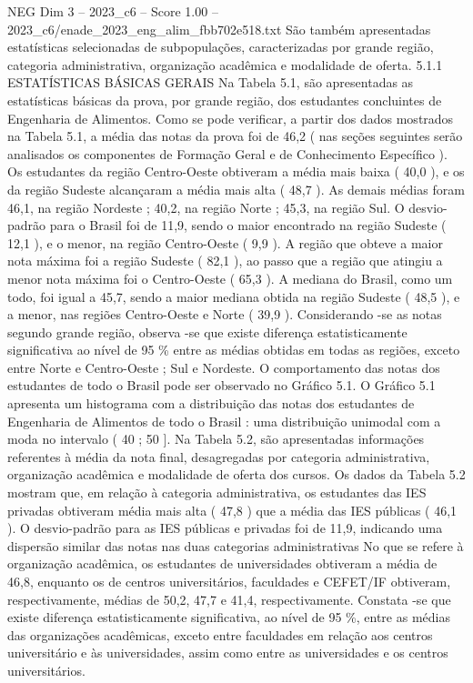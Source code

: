 \begin{textsample}{NEG Dim 3 – 2023\_c6 – Score 1.00 – 2023\_c6/enade\_2023\_eng\_alim\_fbb702e518.txt}
São também apresentadas estatísticas selecionadas de subpopulações, caracterizadas por grande região, categoria administrativa, organização acadêmica e modalidade de oferta. 5.1.1 ESTATÍSTICAS BÁSICAS GERAIS Na Tabela 5.1, são apresentadas as estatísticas básicas da prova, por grande região, dos estudantes concluintes de Engenharia de Alimentos.
Como se pode verificar, a partir dos dados mostrados na Tabela 5.1, a média das notas da prova foi de 46,2 ( nas seções seguintes serão analisados os componentes de Formação Geral e de Conhecimento Específico ).
Os estudantes da região Centro-Oeste obtiveram a média mais baixa ( 40,0 ), e os da região Sudeste alcançaram a média mais alta ( 48,7 ).
As demais médias foram 46,1, na região Nordeste ; 40,2, na região Norte ; 45,3, na região Sul.
O desvio-padrão para o Brasil foi de 11,9, sendo o maior encontrado na região Sudeste ( 12,1 ), e o menor, na região Centro-Oeste ( 9,9 ).
A região que obteve a maior nota máxima foi a região Sudeste ( 82,1 ), ao passo que a região que atingiu a menor nota máxima foi o Centro-Oeste ( 65,3 ).
A mediana do Brasil, como um todo, foi igual a 45,7, sendo a maior mediana obtida na região Sudeste ( 48,5 ), e a menor, nas regiões Centro-Oeste e Norte ( 39,9 ).
Considerando -se as notas segundo grande região, observa -se que existe diferença estatisticamente significativa ao nível de 95 \% entre as médias obtidas em todas as regiões, exceto entre Norte e Centro-Oeste ; Sul e Nordeste.
O comportamento das notas dos estudantes de todo o Brasil pode ser observado no Gráfico 5.1.
O Gráfico 5.1 apresenta um histograma com a distribuição das notas dos estudantes de Engenharia de Alimentos de todo o Brasil : uma distribuição unimodal com a moda no intervalo ( 40 ; 50 ].
Na Tabela 5.2, são apresentadas informações referentes à média da nota final, desagregadas por categoria administrativa, organização acadêmica e modalidade de oferta dos cursos.
Os dados da Tabela 5.2 mostram que, em relação à categoria administrativa, os estudantes das IES privadas obtiveram média mais alta ( 47,8 ) que a média das IES públicas ( 46,1 ).
O desvio-padrão para as IES públicas e privadas foi de 11,9, indicando uma dispersão similar das notas nas duas categorias administrativas No que se refere à organização acadêmica, os estudantes de universidades obtiveram a média de 46,8, enquanto os de centros universitários, faculdades e CEFET/IF obtiveram, respectivamente, médias de 50,2, 47,7 e 41,4, respectivamente.
Constata -se que existe diferença estatisticamente significativa, ao nível de 95 \%, entre as médias das organizações acadêmicas, exceto entre faculdades em relação aos centros universitário e às universidades, assim como entre as universidades e os centros universitários.

\end{textsample}
